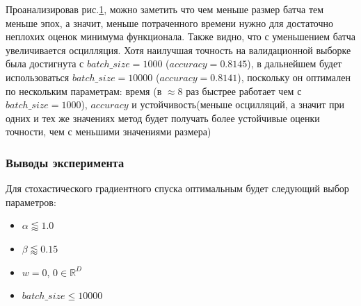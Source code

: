 \begin{enumerate}
\begin{figure}[h]
\begin{subfigure}{.5\textwidth}
            \caption{}
        \end{subfigure}
    \caption{}\label{eq:exp2_fig5}
    \end{figure}
	Проанализировав рис.\ref{eq:exp2_fig5}, можно заметить что чем меньше размер батча тем меньше эпох, а значит, меньше потраченного времени нужно для достаточно неплохих оценок минимума функционала. Также видно, что с уменьшением батча увеличивается осцилляция. Хотя наилучшая точность на валидационной выборке была достигнута с $batch\_size = 1000$    ($accuracy = 0.8145$), в дальнейшем будет использоваться $batch\_size = 10000 $ ($accuracy = 0.8141$), поскольку он оптимален по нескольким параметрам: время (в $\approx\!8$  раз быстрее работает чем с $batch\_size = 1000$), $accuracy$ и устойчивость(меньше осцилляций, а значит при одних и тех же значениях метод будет получать более устойчивые оценки точности, чем с меньшими значениями размера)
\newpage
\subsubsection{Выводы эксперимента}
Для стохастического градиентного спуска оптимальным будет следующий выбор параметров:
\begin{itemize}
	\item $\alpha \lessapprox\!1.0$
	\item $\beta \lessapprox\!0.15$
	\item $w = 0$, $0 \in \mathbb{R}^D$
	\item $batch\_size \leq 10000$
\end{itemize}
\end{enumerate}
